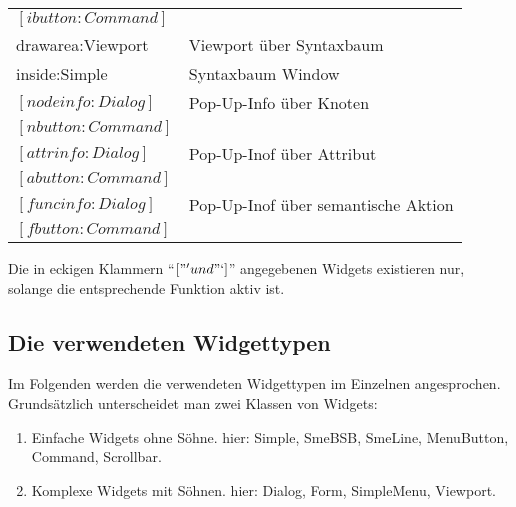 \begin{tabular}{|l|l|}
\hspace{1.0cm}                        $[ibutton:Command]$          &                                         \\
\hspace{0.5cm}                drawarea:Viewport                  &     Viewport \"uber Syntaxbaum           \\
\hspace{1.0cm}                        inside:Simple              &     Syntaxbaum Window                     \\
\hspace{0.5cm}                $[nodeinfo:Dialog]$                  &     Pop-Up-Info \"uber Knoten             \\
\hspace{1.0cm}                        $[nbutton:Command]$          &                                           \\
\hspace{0.5cm}                $[attrinfo:Dialog]$                  &     Pop-Up-Inof \"uber Attribut            \\
\hspace{1.0cm}                        $[abutton:Command]$          &                                           \\
\hspace{0.5cm}                $[funcinfo:Dialog]$                  &     Pop-Up-Inof \"uber semantische Aktion  \\
\hspace{1.0cm}                        $[fbutton:Command]$          &                                            \\
\hline
\end{tabular}
\bigskip

Die in eckigen Klammern "`$["' und "`]$"' angegebenen Widgets existieren nur, solange die entsprechende Funktion aktiv ist.

\subsection{Die verwendeten Widgettypen}

Im Folgenden werden die verwendeten Widgettypen im Einzelnen angesprochen. Grunds\"atzlich unterscheidet man zwei Klassen von Widgets:
\begin{enumerate}
\item{Einfache Widgets ohne S\"ohne. \newline
   hier: Simple, SmeBSB, SmeLine, MenuButton, Command, Scrollbar. }
\item{Komplexe Widgets mit S\"ohnen.   \newline
   hier: Dialog, Form, SimpleMenu, Viewport.  }
\end{enumerate}


